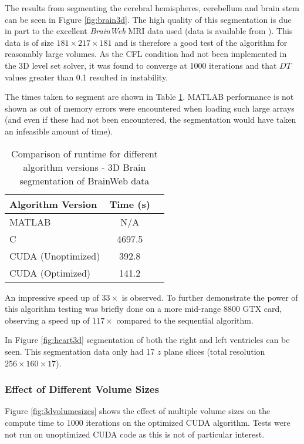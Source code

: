The results from segmenting the cerebral hemispheres, cerebellum and brain stem can be seen in Figure \ref{fig:brain3d}. The high quality of this segmentation is due in part to the excellent \textit{BrainWeb} MRI data used (data is available from \cite{brainweb}). This data is of size $181 \times 217 \times 181$ and is therefore a good test of the algorithm for reasonably large volumes. As the CFL condition had not been implemented in the 3D level set solver, it was found to converge at 1000 iterations and that $DT$ values greater than 0.1 resulted in instability.

The times taken to segment are shown in Table \ref{brain3dtime}. MATLAB performance is not shown as out of memory errors were encountered when loading such large arrays (and even if these had not been encountered, the segmentation would have taken an infeasible amount of time).

\begin{table}[h]
\centering
\begin{tabular}{ | l | c | r | }
	\hline
	Algorithm Version  & Time (s)\\ \hline
  MATLAB 						 & N/A \\
  C 								 & 4697.5 \\
  CUDA (Unoptimized) & 392.8 \\
  CUDA (Optimized)   & 141.2  \\
  \hline
\end{tabular}\caption{Comparison of runtime for different algorithm versions - 3D Brain segmentation of BrainWeb data \cite{brainweb}}
\label{brain3dtime}
\end{table}

An impressive speed up of $33 \times$ is observed. To further demonstrate the power of this algorithm testing was briefly done on a more mid-range 8800 GTX card, observing a speed up of $117 \times$ compared to the sequential algorithm.

In Figure \ref{fig:heart3d} segmentation of both the right and left ventricles can be seen. This segmentation data only had 17 $z$ plane slices (total resolution $256 \times 160 \times 17$).


\subsubsection{Effect of Different Volume Sizes}\label{dimensions3d}


Figure \ref{fig:3dvolumesizes} shows the effect of multiple volume sizes on the compute time to 1000 iterations on the optimized CUDA algorithm. Tests were not run on unoptimized CUDA code as this is not of particular interest.


